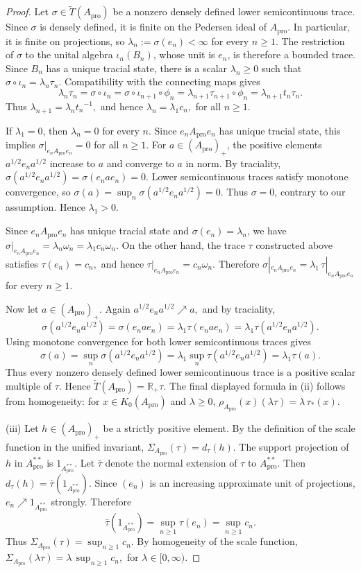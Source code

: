 \documentclass[11pt]{amsart}
\theoremstyle{definition}
\theoremstyle{remark}
\newcommand{\R}{\mathbb{R}}
\newcommand{\ex}{\mathrm{pro}}
\begin{document}
\begin{proof}
Let $\sigma\in\widetilde T(A_{\ex})$ be a nonzero densely defined lower
semicontinuous trace. Since $\sigma$ is densely defined, it is finite on the
Pedersen ideal of $A_{\ex}$. In particular, it is finite on projections, so $\lambda_n:=\sigma(e_n)<\infty$ for every  $n\geq1$.
The restriction of $\sigma$ to the unital algebra $\iota_n(B_n)$, whose unit
is $e_n$, is therefore a bounded trace. Since $B_n$ has a unique tracial
state, there is a scalar $\lambda_n\geq0$ such that $\sigma\circ\iota_n=\lambda_n\tau_n.$
Compatibility with the connecting maps gives
\[
\lambda_n\tau_n
=
\sigma\circ\iota_n
=
\sigma\circ\iota_{n+1}\circ\phi_n
=
\lambda_{n+1}\tau_{n+1}\circ\phi_n
=
\lambda_{n+1}t_n\tau_n.
\]
Thus $\lambda_{n+1}={\lambda_n}{t_n}^{-1},$ and hence
$\lambda_n=\lambda_1c_n,$
for all $n\geq1$.

If $\lambda_1=0$, then $\lambda_n=0$ for every $n$. Since $e_nA_{\ex}e_n$
has unique tracial state, this implies $\sigma|_{e_nA_{\ex}e_n}=0$
for all $n\geq1$. For $a\in (A_{\ex})_+$, the positive elements $a^{1/2}e_na^{1/2}$
increase to $a$ and converge to
$a$ in norm. By traciality,
$\sigma(a^{1/2}e_na^{1/2})=\sigma(e_nae_n)=0.$
Lower semicontinuous traces satisfy monotone convergence, so $\sigma(a)=\sup_n\sigma(a^{1/2}e_na^{1/2})=0.$
Thus $\sigma=0$, contrary to our assumption. Hence $\lambda_1>0$.

Since $e_nA_{\ex}e_n$ has unique tracial state and $\sigma(e_n)=\lambda_n$, we have $\sigma|_{e_nA_{\ex}e_n}=\lambda_n\omega_n
=\lambda_1 c_n\omega_n.$
On the other hand, the trace $\tau$ constructed above satisfies $\tau(e_n)=c_n,$
and hence $\tau|_{e_nA_{\ex}e_n}=c_n\omega_n.$
Therefore $\sigma|_{e_nA_{\ex}e_n}=\lambda_1\,\tau|_{e_nA_{\ex}e_n}$ for every $n\geq1$.

Now let $a\in (A_{\ex})_+$. Again $a^{1/2}e_na^{1/2}\nearrow a,$
and by traciality,
\[
\sigma(a^{1/2}e_na^{1/2})
=
\sigma(e_nae_n)
=
\lambda_1\tau(e_nae_n)
=
\lambda_1\tau(a^{1/2}e_na^{1/2}).
\]
Using monotone convergence for both lower semicontinuous traces gives
\[
\sigma(a)
=
\sup_n\sigma(a^{1/2}e_na^{1/2})
=
\lambda_1\sup_n\tau(a^{1/2}e_na^{1/2})
=
\lambda_1\tau(a).
\]
Thus every nonzero densely defined lower semicontinuous trace is a positive
scalar multiple of $\tau$. Hence $\widetilde T(A_{\ex})=\R_+\tau.$ The final displayed formula in \textup{(ii)} follows from homogeneity:
for $x\in K_0(A_{\ex})$ and $\lambda\geq0$, $\rho_{A_{\ex}}(x)(\lambda\tau)=\lambda\,\tau_*(x).$

\smallskip

\noindent
\textup{(iii)}
Let $h\in (A_{\ex})_+$ be a strictly positive element. By the definition of the scale
function in the unified invariant, $\Sigma_{A_{\ex}}(\tau)=d_\tau(h).$
The support projection of $h$ in $A_{\ex}^{**}$ is $1_{A_{\ex}^{**}}$. Let
$\bar\tau$ denote the normal extension of $\tau$ to $A_{\ex}^{**}$. Then
$d_\tau(h)=\bar\tau(1_{A_{\ex}^{**}}).$
Since $(e_n)$ is an increasing approximate unit of projections, $e_n\nearrow
1_{A_{\ex}^{**}}$ strongly. Therefore
\[
\bar\tau(1_{A_{\ex}^{**}})
=
\sup_{n\geq1}\tau(e_n)
=
\sup_{n\geq1}c_n.
\]
Thus $\Sigma_{A_{\ex}}(\tau)=\sup_{n\geq1}c_n.$
By homogeneity of the scale function, $
\Sigma_{A_{\ex}}(\lambda\tau)=\lambda\,\sup_{n\geq1}c_n,$ for $
\lambda\in[0,\infty).$


\end{proof}
\end{document}

